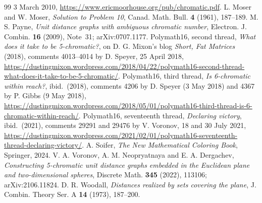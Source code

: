 \documentclass[11pt,a4paper]{amsart}
\theoremstyle{remark}
\begin{document}
\begin{thebibliography}{99}
3 March 2010, \url{https://www.ericmoorhouse.org/pub/chromatic.pdf}.
 L. Moser and W. Moser, \emph{Solution to Problem 10}, Canad. Math. Bull. \textbf{4} (1961),
187--189.
 M. S. Payne, \emph{Unit distance graphs with ambiguous chromatic number}, Electron. J. Combin.
\textbf{16} (2009), Note~31; arXiv:0707.1177.
 Polymath16, second thread, \emph{What does it take to be 5-chromatic?}, on D. G. Mixon's
blog \emph{Short, Fat Matrices} (2018), comments 4013--4014 by D. Speyer, 25 April 2018,
\url{https://dustingmixon.wordpress.com/2018/04/22/polymath16-second-thread-what-does-it-take-to-be-5-chromatic/}.
 Polymath16, third thread, \emph{Is 6-chromatic within reach?}, ibid.\ (2018), comments 4206
by D. Speyer (3 May 2018) and 4367 by P. Gibbs (9 May 2018),
\url{https://dustingmixon.wordpress.com/2018/05/01/polymath16-third-thread-is-6-chromatic-within-reach/}.
 Polymath16, seventeenth thread, \emph{Declaring victory}, ibid.\ (2021), comments 29291 and
29476 by V. Voronov, 18 and 30 July 2021,
\url{https://dustingmixon.wordpress.com/2021/02/01/polymath16-seventeenth-thread-declaring-victory/}.
 A. Soifer, \emph{The New Mathematical Coloring Book}, Springer, 2024.
 V. A. Voronov, A. M. Neopryatnaya and E. A. Dergachev, \emph{Constructing 5-chromatic unit distance
graphs embedded in the Euclidean plane and two-dimensional spheres}, Discrete Math. \textbf{345} (2022), 113106;
arXiv:2106.11824.
 D. R. Woodall, \emph{Distances realized by sets covering the plane}, J. Combin. Theory Ser. A
\textbf{14} (1973), 187--200.
\end{thebibliography}
\end{document}
